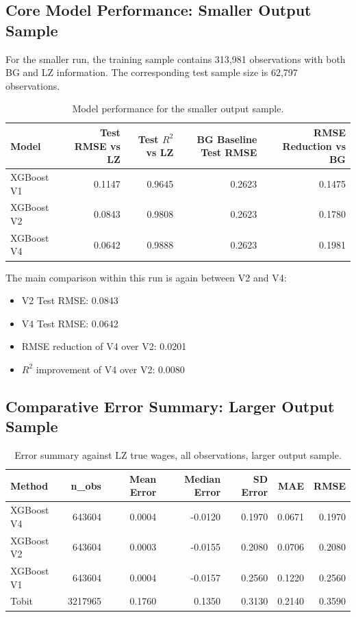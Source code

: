 \documentclass{article}
\begin{document}
\subsection{Core Model Performance: Smaller Output Sample}

For the smaller run, the training sample contains 313,981 observations with both BG and LZ information. The corresponding test sample size is 62,797 observations.

\begin{table}[H]
\centering
\begin{tabular}{lrrrr}
\toprule
Model & Test RMSE vs LZ & Test $R^2$ vs LZ & BG Baseline Test RMSE & RMSE Reduction vs BG \\
\midrule
XGBoost V1 & 0.1147 & 0.9645 & 0.2623 & 0.1475 \\
XGBoost V2 & 0.0843 & 0.9808 & 0.2623 & 0.1780 \\
XGBoost V4 & 0.0642 & 0.9888 & 0.2623 & 0.1981 \\
\bottomrule
\end{tabular}
\caption{Model performance for the smaller output sample.}
\label{tab:v4_small_performance}
\end{table}

\noindent
The main comparison within this run is again between V2 and V4:
\begin{itemize}
    \item V2 Test RMSE: 0.0843
    \item V4 Test RMSE: 0.0642
    \item RMSE reduction of V4 over V2: 0.0201
    \item $R^2$ improvement of V4 over V2: 0.0080
\end{itemize}

\subsection{Comparative Error Summary: Larger Output Sample}

\begin{table}[H]
\centering
\begin{tabular}{lrrrrrr}
\toprule
Method & n\_obs & Mean Error & Median Error & SD Error & MAE & RMSE \\
\midrule
XGBoost V4 & 643604 & 0.0004 & -0.0120 & 0.1970 & 0.0671 & 0.1970 \\
XGBoost V2 & 643604 & 0.0003 & -0.0155 & 0.2080 & 0.0706 & 0.2080 \\
XGBoost V1 & 643604 & 0.0004 & -0.0157 & 0.2560 & 0.1220 & 0.2560 \\
Tobit      & 3217965 & 0.1760 & 0.1350 & 0.3130 & 0.2140 & 0.3590 \\
\bottomrule
\end{tabular}
\caption{Error summary against LZ true wages, all observations, larger output sample.}
\label{tab:error_summary_large_all}
\end{table}
\end{document}
